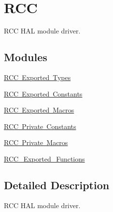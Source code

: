 \hypertarget{group___r_c_c}{}\section{R\+CC}
\label{group___r_c_c}


R\+CC H\+AL module driver.  


\subsection*{Modules}
\begin{DoxyCompactItemize}
\item 
\mbox{\hyperlink{group___r_c_c___exported___types}{R\+C\+C Exported Types}}
\item 
\mbox{\hyperlink{group___r_c_c___exported___constants}{R\+C\+C Exported Constants}}
\item 
\mbox{\hyperlink{group___r_c_c___exported___macros}{R\+C\+C Exported Macros}}
\item 
\mbox{\hyperlink{group___r_c_c___private___constants}{R\+C\+C Private Constants}}
\item 
\mbox{\hyperlink{group___r_c_c___private___macros}{R\+C\+C Private Macros}}
\item 
\mbox{\hyperlink{group___r_c_c___exported___functions}{R\+C\+C\+\_\+\+Exported\+\_\+\+Functions}}
\end{DoxyCompactItemize}


\subsection{Detailed Description}
R\+CC H\+AL module driver. 

